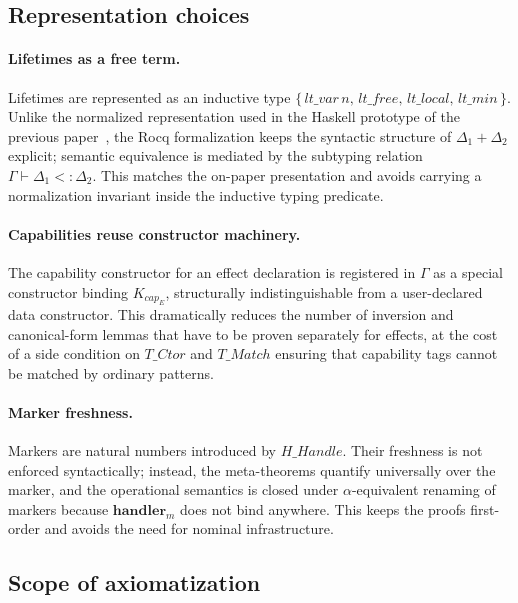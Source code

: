 \documentclass[12pt,a4paper]{article}
\newcommand{\keyword}[1]{\mathbf{#1}}
\begin{document}
    \subsection{Representation choices}

    \paragraph{Lifetimes as a free term.}
    Lifetimes are represented as an inductive type
    $\{\,lt\_var\,n,\,lt\_free,\,lt\_local,\,lt\_min\,\}$.
    Unlike the normalized representation used in the Haskell prototype of the previous
    paper~\cite{stoyan2025existential}, the Rocq formalization keeps the syntactic
    structure of $\Delta_1 + \Delta_2$ explicit; semantic equivalence is mediated by the
    subtyping relation $\Gamma \vdash \Delta_1 <: \Delta_2$.
    This matches the on-paper presentation and avoids carrying a normalization invariant
    inside the inductive typing predicate.

    \paragraph{Capabilities reuse constructor machinery.}
    The capability constructor for an effect declaration is registered in $\Gamma$ as a
    special constructor binding $K_{cap_E}$, structurally indistinguishable from a
    user-declared data constructor.
    This dramatically reduces the number of inversion and canonical-form lemmas that
    have to be proven separately for effects, at the cost of a side condition on
    $T\!\_Ctor$ and $T\!\_Match$ ensuring that capability tags cannot be matched by
    ordinary patterns.

    \paragraph{Marker freshness.}
    Markers are natural numbers introduced by $H\!\_Handle$.
    Their freshness is not enforced syntactically; instead, the meta-theorems
    quantify universally over the marker, and the operational semantics is closed
    under $\alpha$-equivalent renaming of markers because $\keyword{handler}_m$ does
    not bind anywhere.
    This keeps the proofs first-order and avoids the need for nominal infrastructure.

    \subsection{Scope of axiomatization}
\end{document}
